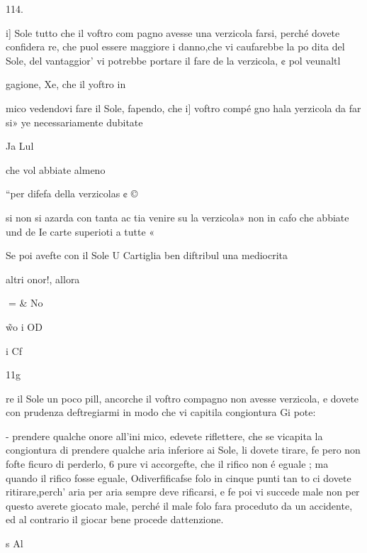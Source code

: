 \documentclass[12pt,a6paper]{article}
\begin{document}
 

 

 

 

 

 

 

114.

i] Sole tutto che il voftro com
pagno avesse una verzicola
farsi, perché dovete confidera
re, che puol essere maggiore i
danno,che vi caufarebbe la po
dita del Sole, del vantaggior’
vi potrebbe portare il fare de
la verzicola, ¢ pol veunaltl

gagione, Xe, che il yoftro in

mico vedendovi fare il Sole,
fapendo, che i] voftro compé
gno hala yerzicola da far si»
ye necessariamente dubitate

Ja Lul

che vol abbiate almeno

“per difefa della verzicolas ¢ ©

si non si azarda con tanta ac
tia venire su la verzicola»
non in cafo che abbiate und de
Ie carte superioti a tutte «

Se poi avefte con il Sole U
Cartiglia ben diftribul
una mediocrita

altri onor!, allora

 
= & No

\~ wo i OD

i
Cf

11g

re il Sole un poco pill, ancorche
il voftro compagno non avesse
verzicola, e dovete con prudenza deftregiarmi in modo che
vi capitila congiontura Gi pote:

- prendere qualche onore all’ini
mico, edevete riflettere, che
se vicapita la congiontura di
prendere qualche aria inferiore
ai Sole, li dovete tirare, fe pero non fofte ficuro di perderlo,
6 pure vi accorgefte, che il
rifico non é eguale ; ma quando
il rifico fosse eguale, Odiverfificafse folo in cinque punti tan
to ci dovete ritirare,perch’ aria
per aria sempre deve rificarsi, e
fe poi vi succede male non per
questo averete giocato male,
perché il male folo fara proceduto da un accidente, ed al contrario il giocar bene procede
dattenzione.

s Al

 

 

 

 
 

 
\end{document}
